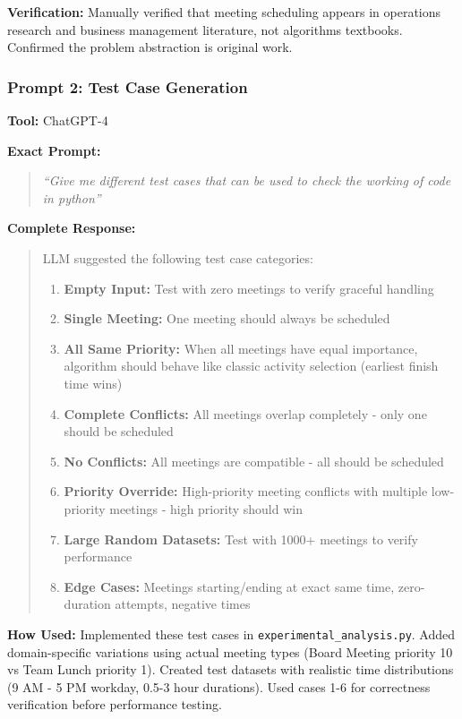 \documentclass[conference]{IEEEtran}
\begin{document}
\textbf{Verification:}
Manually verified that meeting scheduling appears in operations research and business management literature, not algorithms textbooks. Confirmed the problem abstraction is original work.

\vspace{0.4cm}

\subsubsection{Prompt 2: Test Case Generation}

\textbf{Tool:} ChatGPT-4

\textbf{Exact Prompt:}
\begin{quote}
\textit{``Give me different test cases that can be used to check the working of code in python''}
\end{quote}

\textbf{Complete Response:}
\begin{quote}
\small
LLM suggested the following test case categories:
\begin{enumerate}
    \item \textbf{Empty Input:} Test with zero meetings to verify graceful handling
    \item \textbf{Single Meeting:} One meeting should always be scheduled
    \item \textbf{All Same Priority:} When all meetings have equal importance, algorithm should behave like classic activity selection (earliest finish time wins)
    \item \textbf{Complete Conflicts:} All meetings overlap completely - only one should be scheduled
    \item \textbf{No Conflicts:} All meetings are compatible - all should be scheduled
    \item \textbf{Priority Override:} High-priority meeting conflicts with multiple low-priority meetings - high priority should win
    \item \textbf{Large Random Datasets:} Test with 1000+ meetings to verify performance
    \item \textbf{Edge Cases:} Meetings starting/ending at exact same time, zero-duration attempts, negative times
\end{enumerate}
\end{quote}

\textbf{How Used:}
Implemented these test cases in \texttt{experimental\_analysis.py}. Added domain-specific variations using actual meeting types (Board Meeting priority 10 vs Team Lunch priority 1). Created test datasets with realistic time distributions (9 AM - 5 PM workday, 0.5-3 hour durations). Used cases 1-6 for correctness verification before performance testing.
\end{document}

